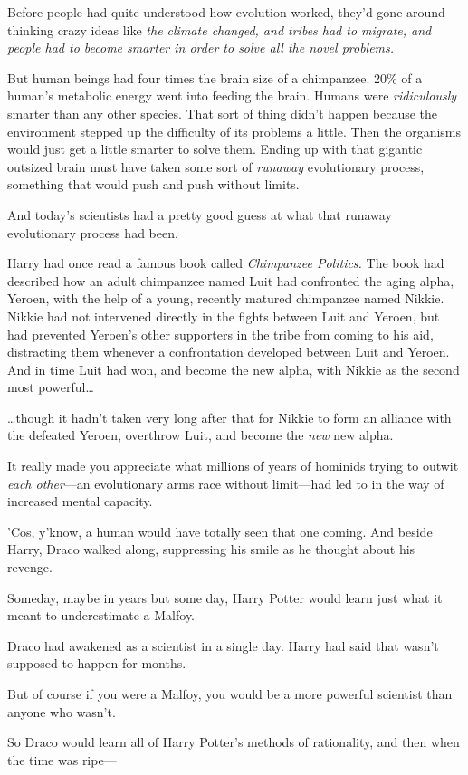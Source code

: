 Before people had quite understood how evolution worked, they'd gone around
thinking crazy ideas like \emph{the climate changed, and tribes had to migrate,
and people had to become smarter in order to solve all the novel problems.}

But human beings had four times the brain size of a chimpanzee. 20\% of a
human's metabolic energy went into feeding the brain. Humans were
\emph{ridiculously} smarter than any other species. That sort of thing didn't
happen because the environment stepped up the difficulty of its problems a
little. Then the organisms would just get a little smarter to solve them.
Ending up with that gigantic outsized brain must have taken some sort of
\emph{runaway} evolutionary process, something that would push and push without
limits.

And today's scientists had a pretty good guess at what that runaway
evolutionary process had been.

Harry had once read a famous book called \emph{Chimpanzee Politics.} The book
had described how an adult chimpanzee named Luit had confronted the aging
alpha, Yeroen, with the help of a young, recently matured chimpanzee named
Nikkie. Nikkie had not intervened directly in the fights between Luit and
Yeroen, but had prevented Yeroen's other supporters in the tribe from coming to
his aid, distracting them whenever a confrontation developed between Luit and
Yeroen. And in time Luit had won, and become the new alpha, with Nikkie as the
second most powerful…

…though it hadn't taken very long after that for Nikkie to form an
alliance with the defeated Yeroen, overthrow Luit, and become the \emph{new}
new alpha.

It really made you appreciate what millions of years of hominids trying to
outwit \emph{each other}---an evolutionary arms race without limit---had led to
in the way of increased mental capacity.

'Cos, y'know, a human would have totally seen that one coming.
\later
And beside Harry, Draco walked along, suppressing his smile as he thought about
his revenge.

Someday, maybe in years but some day, Harry Potter would learn just what it
meant to underestimate a Malfoy.

Draco had awakened as a scientist in a single day. Harry had said that wasn't
supposed to happen for months.

But of course if you were a Malfoy, you would be a more powerful scientist than
anyone who wasn't.

So Draco would learn all of Harry Potter's methods of rationality, and then
when the time was ripe---
